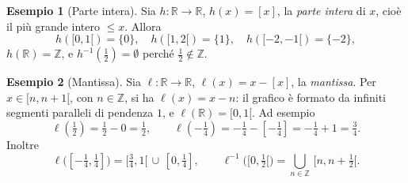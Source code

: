 \documentclass[11pt,a4paper]{article}
\theoremstyle{definition}
\newtheorem*{esempio}{Esempio}
\begin{document}
\begin{esempio}[Parte intera]
Sia $h : \mathbb{R} \to \mathbb{R}$, $h(x) = [x]$, la \emph{parte intera} di $x$, cioè il più grande intero $\leq x$. Allora
\[
h([0, 1[) = \{0\}, \quad h([1, 2[) = \{1\}, \quad h([-2, -1[) = \{-2\},
\]
$h(\mathbb{R}) = \mathbb{Z}$, e $h^{-1}(\tfrac12) = \emptyset$ perché $\frac12 \notin \mathbb{Z}$.
\end{esempio}

\begin{esempio}[Mantissa]
Sia $\ell : \mathbb{R} \to \mathbb{R}$, $\ell(x) = x - [x]$, la \emph{mantissa}. Per $x \in [n, n+1[$, con $n \in \mathbb{Z}$, si ha $\ell(x) = x - n$: il grafico è formato da infiniti segmenti paralleli di pendenza $1$, e $\ell(\mathbb{R}) = [0, 1[$. Ad esempio
\[
\ell(\tfrac12) = \tfrac12 - 0 = \tfrac12, \qquad
\ell(-\tfrac14) = -\tfrac14 - [-\tfrac14] = -\tfrac14 + 1 = \tfrac34.
\]
Inoltre
\[
\ell\big([-\tfrac14, \tfrac14]\big) = [\tfrac34, 1[ \,\cup\, [0, \tfrac14],
\qquad
\ell^{-1}\big([0, \tfrac12[\big) = \bigcup_{n \in \mathbb{Z}} \,[n, n + \tfrac12[.
\]
\end{esempio}
\end{document}

